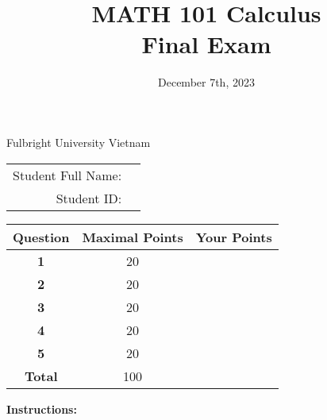 \documentclass[]{exam}  %
\begin{document}
	\title{MATH 101 Calculus\\ Final Exam}
	\date{December 7th, 2023}
	
	\begin{center}
		\Large
		{\bfseries\makeatletter\@title\makeatother}
		
		\bigskip
		
		Fulbright University Vietnam
		
		\makeatletter\@date\makeatother
		
		\vspace{1pc}
		
		
		\vspace{1pc}
		\vfill
		
		\begin{tabular}{rp{10cm}}
			Student Full Name: & \hrulefill \\[1pc]
			Student ID: & \hrulefill \\[1pc]
		\end{tabular}
		
		\vfill
		
		\begin{tabular}{| >{\bfseries}c | c | c | }
			\hline
			Question & \bfseries Maximal Points &\bfseries Your Points\\
			\hline
			\hline
			1 &  20 &\\ \hline
			2 &  20 &\\ \hline
			3 &  20 &\\ \hline
			4 &  20 &\\ \hline
			5 &  20 &\\ \hline
			\hline
			Total & 100 & \\
			\hline
		\end{tabular}
		
	\end{center}
	
	
	\vfill
	
	\textbf{Instructions:}
	
\end{document}
